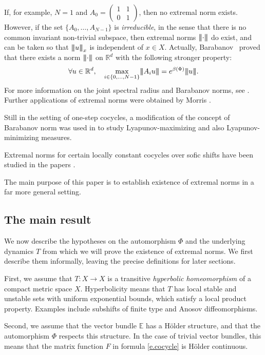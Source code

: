 \documentclass[JEP,XML,SOM,Unicode]{cedram}
\theoremstyle{plain}
\theoremstyle{definition}
\newcommand{\tribar}[1]{\mathopen{| {\kern -1.5pt} | {\kern -1.5pt} |} {#1}
\mathclose{| {\kern -1.5pt} | {\kern -1.5pt} |}}
\newcommand{\RR}{\mathbb{R}}
\newcommand{\EE}{\mathbb{E}}
\begin{document}
If, for example, $N=1$ and $A_0 = \left( \begin{smallmatrix} 1 & 1 \\ 0 & 1 \end{smallmatrix} \right)$, then no extremal norm exists. However, if the set $\{A_0,\dots,A_{N-1}\}$ is \emph{irreducible}, in the sense that there is no common invariant non-trivial subspace, then extremal norms $\tribar{\cdot}$ do exist, and can be taken so that
$\tribar{u}_x$ is independent of $x \in X$.
Actually, Barabanov~\cite{Barabanov} proved that there exists a norm $\tribar{\cdot}$ on $\RR^d$ with the following stronger property:
\begin{equation}\label{e.Barabanov}
\forall u \in \RR^d, \quad
\max_{i \in \{0,\dots,N-1\}} \tribar{A_i u} = e^{\beta(\Phi)} \tribar{u}.
\end{equation}
For more information on the joint spectral radius and Barabanov norms, see \cite{Wirth,Jungers}.
Further applications of extremal norms were obtained by Morris \cite{Morris_rapidly,Morris_Mather}.

Still in the setting of one-step cocycles, a modification of the concept of Barabanov norm was used in \cite{BR,BM} to study Lyapunov-maximizing and also Lyapunov-minimizing measures.

Extremal norms for certain locally constant cocycles over sofic shifts have been studied in the papers \cite{PEDJ,CGP}.

The main purpose of this paper is to establish existence of extremal norms in a far more general setting.

\subsection{The main result}

We now describe the hypotheses on the automorphism $\Phi$ and the underlying dynamics $T$ from which we will prove the existence of extremal norms. We first describe them informally, leaving the precise definitions for later sections.

First, we assume that $T \colon X \to X$ is a transitive \emph{hyperbolic homeomorphism} of a compact metric space $X$. Hyperbolicity means that $T$ has local stable and unstable sets with uniform exponential bounds, which satisfy a local product property. Examples include subshifts of finite type and Anosov diffeomorphisms.

Second, we assume that the vector bundle $\EE$ has a Hölder structure, and that the automorphism $\Phi$ respects this structure. In the case of trivial vector bundles, this means that the matrix function $F$ in formula \eqref{e.cocycle} is Hölder continuous.
\end{document}
